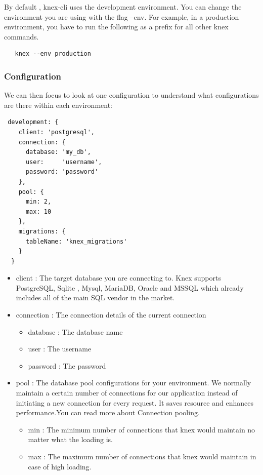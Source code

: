 \documentclass[a4paper]{article}
\begin{document}
By default , knex-cli uses the development environment. You can change the environment you are using with the flag --env. For example, in a production environment, you have to run the following as a prefix for all other knex commands.
\begin{lstlisting}
   knex --env production
\end{lstlisting}
\subsubsection{Configuration}
We can then focus to look at one configuration to understand what configurations are there within each environment:
\begin{lstlisting}
 development: {
    client: 'postgresql',
    connection: {
      database: 'my_db',
      user:     'username',
      password: 'password'
    },
    pool: {
      min: 2,
      max: 10
    },
    migrations: {
      tableName: 'knex_migrations'
    } 
  }
\end{lstlisting}
\begin{itemize}
\item client : The target database you are connecting to. Knex supports PostgreSQL, Sqlite , Mysql, MariaDB, Oracle and MSSQL which already includes all of the main SQL vendor in the market.
\item connection : The connection details of the current connection
        \begin{itemize}
        \item database : The database name
        \item user : The username
        \item password : The password
        \end{itemize}
\item pool : The database pool configurations for your environment. We normally maintain a certain number of connections for our application instead of initiating a new connection for every request. It saves resource and enhances performance.You can read more about Connection pooling.
        \begin{itemize}
        \item min : The minimum number of connections that knex would maintain no matter what the loading is.
        \item max : The maximum number of connections that knex would maintain in case of high loading.

        \end{itemize}
\end{itemize}
\end{document}
